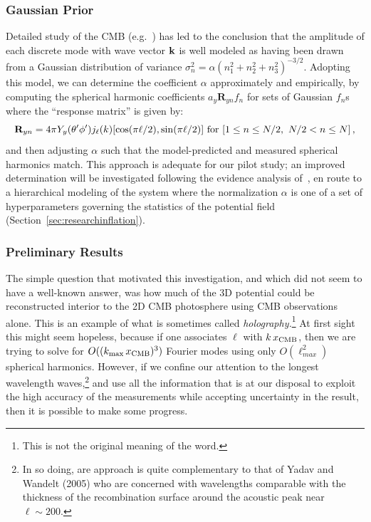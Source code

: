 \documentclass[psfig,11pt]{article}
\begin{document}
\subsubsection{Gaussian Prior}
\label{sec:fnGaussianPrior}

Detailed study of the CMB (e.g.~\cite{Aghanim:2015xee, Ade:2015ava}) has led to the conclusion that the amplitude of each discrete mode with wave vector $\bf k$ is well modeled as having been drawn from a Gaussian distribution of variance $\sigma_{ n}^2=\alpha(n_1^2+n_2^2+n_3^2)^{-3/2}$. Adopting this model, we can determine the coefficient $\alpha$ approximately and empirically, by computing the spherical harmonic coefficients $a_y \mathbf{R}_{yn}f_n$ for sets of Gaussian $f_n$s where the ``response matrix'' is given by:
\begin{equation}
\mathbf{R}_{yn}=4\pi Y_y(\theta'\phi')j_\ell(k)[\cos(\pi\ell/2),\sin(\pi\ell/2)]\ {\rm for}\ [1\le n\le N/2,\ N/2<n\le N]\, ,
\end{equation}
and then adjusting $\alpha$ such that the model-predicted and measured spherical harmonics match. This approach is adequate for our pilot study; an improved determination will be investigated following the evidence analysis of~\cite{Suyu2006}, en route to a hierarchical modeling of the system where the normalization $\alpha$ is one of a set of hyperparameters governing the statistics of the potential field (Section~\ref{sec:researchinflation}).


\subsubsection{Preliminary Results}

The simple question that motivated this investigation, and which did not seem to have a well-known answer, was how much of the 3D potential could be reconstructed interior to the 2D CMB photosphere using CMB observations alone. This is an example of what is sometimes called {\it holography.}\footnote{This is not the original meaning of the word.}  At first sight this might seem hopeless, because if one associates $\ell$ with $k\,x_{\rm CMB}$, then we are trying to solve for $O((k_{\rm max}\,x_{\rm CMB})^3)$ Fourier modes using only $O(\ell_{max}^2)$ spherical harmonics. However, if we confine our attention to the longest wavelength waves,\footnote{In so doing, are approach is quite complementary to that of Yadav and Wandelt (2005) who are concerned with wavelengths comparable with the thickness of the recombination surface around the acoustic peak near $\ell\sim200$.} and use all the information that is at our disposal to exploit the high accuracy of the measurements while accepting uncertainty in the result, then it is possible to make some progress.
\end{document}
